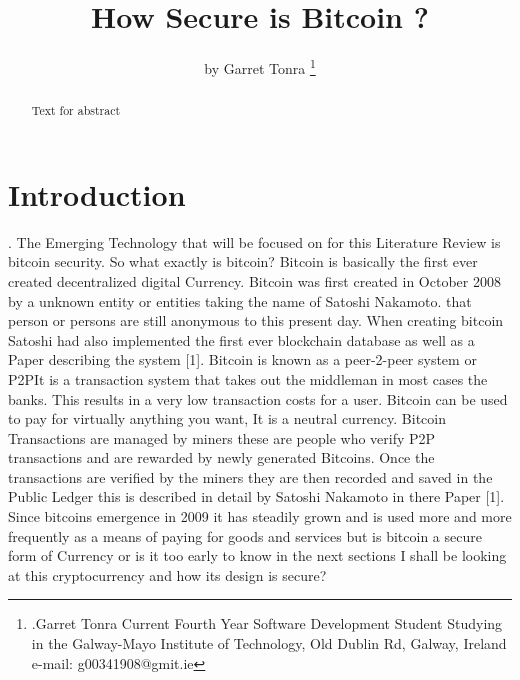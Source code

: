\documentclass[report]{IEEEtran}
\begin{document}
\title{How Secure is Bitcoin ? }
\author{by Garret Tonra %
\thanks{.\newline Garret Tonra Current Fourth Year
Software Development Student Studying in the Galway-Mayo Institute of Technology, Old Dublin Rd, Galway, Ireland 
e-mail: g00341908@gmit.ie}%
}

\maketitle

\begin{abstract}
Text for abstract
\end{abstract}


\section{Introduction}.\newline
The Emerging Technology that will be  focused on for this Literature Review is bitcoin security. So what exactly is bitcoin?\newline
Bitcoin is basically the first ever created decentralized digital Currency. Bitcoin was first created in October 2008 by a unknown entity or entities taking the name of Satoshi Nakamoto. that person or persons are still anonymous to this present day. When creating bitcoin Satoshi had also implemented the first ever blockchain database as well as a Paper describing the system [1]. Bitcoin is known as a peer-2-peer system or P2P\newline It is a transaction system that takes out the middleman in most cases the banks. This results in a very low transaction costs for a user. Bitcoin can be used to pay for virtually anything you want, It is a neutral currency. Bitcoin Transactions are managed by miners these are people who verify P2P transactions and are rewarded by newly generated Bitcoins. Once the transactions are verified by the miners they are then recorded and saved in the Public Ledger this is described in detail by Satoshi Nakamoto in there Paper [1]. Since bitcoins emergence in 2009 it has steadily grown and is used more and more frequently as a means of paying for goods and services but is bitcoin a secure form of Currency or is it too early to know in the next sections I shall be looking at this cryptocurrency and how its design is secure?
\end{document}

